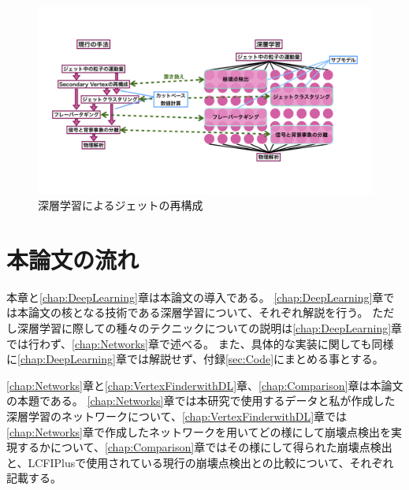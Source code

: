 \begin{figure}[htbp]
 \centering
 \includegraphics[width=1.0\textwidth]{Figure/1Introduction/6JetReconstructionwithDeepLearning.png}
 \caption{深層学習によるジェットの再構成}
 \label{6JetReconstructionwithDeepLearning}
\end{figure}


\section{本論文の流れ} \label{Intro:Flow}

本章と\ref{chap:DeepLearning}章は本論文の導入である。
\ref{chap:DeepLearning}章では本論文の核となる技術である深層学習について、それぞれ解説を行う。
ただし深層学習に際しての種々のテクニックについての説明は\ref{chap:DeepLearning}章では行わず、\ref{chap:Networks}章で述べる。
また、具体的な実装に関しても同様に\ref{chap:DeepLearning}章では解説せず、付録\ref{sec:Code}にまとめる事とする。

\ref{chap:Networks}章と\ref{chap:VertexFinderwithDL}章、\ref{chap:Comparison}章は本論文の本題である。
\ref{chap:Networks}章では本研究で使用するデータと私が作成した深層学習のネットワークについて、\ref{chap:VertexFinderwithDL}章では\ref{chap:Networks}章で作成したネットワークを用いてどの様にして崩壊点検出を実現するかについて、\ref{chap:Comparison}章ではその様にして得られた崩壊点検出と、LCFIPlusで使用されている現行の崩壊点検出との比較について、それぞれ記載する。















